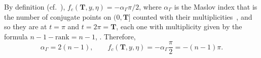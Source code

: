 \documentclass[11pt,a4paper,times]{amsart}
\theoremstyle{plain}
\theoremstyle{definition}
\numberwithin{equation}{section}
\newcommand{\txtr}{\textcolor{red}}
\begin{document}
{%
By definition (cf.~\cite[Definition 1.7.2, p.\ 52]{sava}),  $f_c(\boldsymbol{T},y,\eta)=-\alpha_{\Gamma}\pi/2$, where $\alpha_{\Gamma}$ is the Maslov index that is the number of
conjugate points on $(0,\boldsymbol{T}]$ counted with their multiplicities~\cite[Example 1.5.8., p.\ 36]{sava}, and so they are at $t=\pi$ and $t= 2\pi=\boldsymbol{T}$, each one with
multiplicity given by the formula $n-1-\mathrm{rank}=n-1$, \cite[p.\ 34]{sava}. Therefore,
\begin{equation}\label{fc}
\alpha_{\Gamma}=2(n-1), \quad\quad f_c(\boldsymbol{T}, y,\eta)=-\alpha_{\Gamma}\frac{\pi}{2}= -(n-1)\pi.
\end{equation}

}
\end{document}
